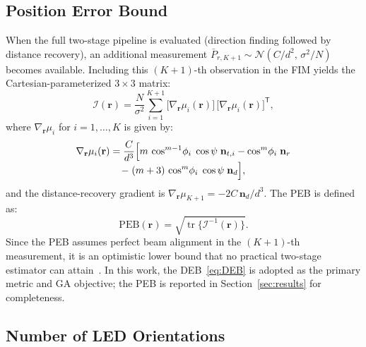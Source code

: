 \documentclass[journal]{IEEEtran}
\begin{document}
\subsection{Position Error Bound}
\label{subsec:PEB}
When the full two-stage pipeline is evaluated (direction finding followed by distance recovery), an additional measurement $\bar P_{r,K+1}\sim\mathcal{N}(C/d^2,\,\sigma^2/N)$ becomes available. Including this $(K{+}1)$-th observation in the FIM yields the Cartesian-parameterized $3\times3$ matrix:
\begin{equation}
\mathcal{I}(\mathbf r)
= \frac{N}{\sigma^{2}}
  \sum_{i=1}^{K+1}
  \bigl[\nabla_{\mathbf r}\mu_i(\mathbf r)\bigr]\,
  \bigl[\nabla_{\mathbf r}\mu_i(\mathbf r)\bigr]^{\!\mathsf T},
\label{eq:FIM_general}
\end{equation}
where $\nabla_{\mathbf r}\mu_i$ for $i=1,\ldots,K$ is given by:
\begin{multline}
    \nabla_{\mathbf r}\mu_i(\mathbf r)
    = \frac{C}{d^{3}}
      \Bigl[
        m\,\cos^{m-1}\!\phi_i\;\cos\psi\;\mathbf n_{t,i}
        -
        \cos^{m}\!\phi_i\;\mathbf n_{r}
    \\[-3pt]
        -\;
        (m+3)\,\cos^{m}\!\phi_i\;\cos\psi\;\mathbf n_{d}
      \Bigr],
    \label{eq:grad_mu_closed}
\end{multline}
and the distance-recovery gradient is $\nabla_{\mathbf r}\mu_{K+1} = -2C\,\mathbf n_d/d^3$. The PEB is defined as:
\begin{equation}
\mathrm{PEB}(\mathbf r)
= \sqrt{\operatorname{tr}\!\bigl\{\mathcal{I}^{-1}(\mathbf r)\bigr\}}.
\label{eq:PEB}
\end{equation}
Since the PEB assumes perfect beam alignment in the $(K{+}1)$-th measurement, it is an optimistic lower bound that no practical two-stage estimator can attain~\cite{Kay1993}. In this work, the DEB~\eqref{eq:DEB} is adopted as the primary metric and GA objective; the PEB is reported in Section~\ref{sec:results} for completeness.

\subsection{Number of LED Orientations}
\label{subsec:Kchoice}
\end{document}
